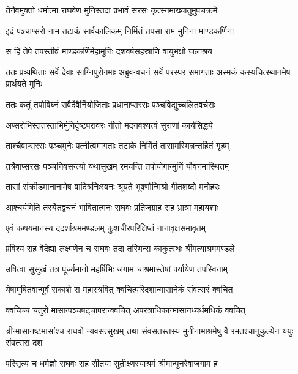 \twolineshloka
{तेनैवमुक्तो धर्मात्मा राघवेण मुनिस्तदा}
{प्रभावं सरसः कृत्स्नमाख्यातुमुपचक्रमे} %

\twolineshloka
{इदं पञ्चाप्सरो नाम तटाकं सार्वकालिकम्}
{निर्मितं तपसा राम मुनिना माण्डकर्णिना} %

\twolineshloka
{स हि तेपे तपस्तीव्रं माण्डकर्णिर्महामुनिः}
{दशवर्षसहस्राणि वायुभक्षो जलाश्रय} %

\threelineshloka
{ततः प्रव्यथिताः सर्वे देवाः साग्निपुरोगमाः}
{अब्रुवन्वचनं सर्वे परस्पर समागताः}
{अस्मकं कस्यचित्स्थानमेष प्रार्थयते मुनिः} %

\twolineshloka
{ततः कर्तुं तपोविघ्नं सर्वैर्देवैर्नियोजिताः}
{प्रधानाप्सरसः पञ्चविद्युच्चलितवर्चसः} %

\twolineshloka
{अप्सरोभिस्ततस्ताभिर्मुनिर्दृष्टपरावरः}
{नीतो मदनवश्यत्वं सुराणां कार्यसिद्धये} %

\twolineshloka
{ताश्चैवाप्सरसः पञ्चमुनेः पत्नीत्वमागताः}
{तटाके निर्मितं तासामस्मिन्नन्तर्हितं गृहम्} %

\twolineshloka
{तत्रैवाप्सरसः पञ्चनिवसन्त्यो यथासुखम्}
{रमयन्ति तपोयोगान्मुनिं यौवनमास्थितम्} %

\twolineshloka
{तासां संक्रीडमानानामेष वादित्रनिःस्वनः}
{श्रूयते भूषणोन्मिश्रो गीतशब्दो मनोहरः} %

\twolineshloka
{आश्चर्यमिति तस्यैतद्वचनं भावितात्मनः}
{राघवः प्रतिजग्राह सह भ्रात्रा महायशाः} %

\twolineshloka
{एवं कथयमानस्य ददर्शाश्रममण्डलम्}
{कुशचीरपरिक्षिप्तं नानावृक्षसमावृतम्} %

\twolineshloka
{प्रविश्य सह वैदेह्या लक्ष्मणेन च राघवः}
{तदा तस्मिन्स काकुत्स्थः श्रीमत्याश्रममण्डले} %

\twolineshloka
{उषित्वा सुसुखं तत्र पूर्ज्यमानो महर्षिभिः}
{जगाम चाश्रमांस्तेषां पर्यायेण तपस्विनाम्} %

\twolineshloka
{येषामुषितवान्पूर्वं सकाशे स महास्त्रवित्}
{क्वचित्परिदशान्मासानेकं संवत्सरं क्वचित्} %

\twolineshloka
{क्वचिच्च चतुरो मासान्पञ्चषट्चापरान्क्वचित्}
{अपरत्राधिकान्मासानध्यर्धमधिकं क्वचित्} %

\threelineshloka
{त्रीन्मासानष्टमासांश्च राघवो न्यवसत्सुखम्}
{तथा संवसतस्तस्य मुनीनामाश्रमेषु वै}
{रमतश्चानुकुल्येन ययुः संवत्सरा दश} %

\twolineshloka
{परिसृत्य च धर्मज्ञो राघवः सह सीतया}
{सुतीक्ष्णस्याश्रमं श्रीमान्पुनरेवाजगाम ह} %

